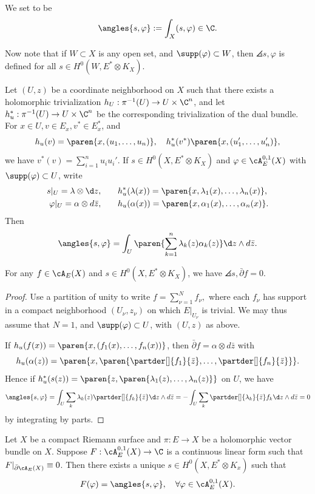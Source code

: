 \documentclass[11pt]{report}
\begin{document}
\begin{defn}
We set  to be
\[
\angles{s,\varphi}:= \int_X(s,\varphi) \in \C.
\]
\end{defn}
Now note that if $W \subset X$ is any open set, and $\supp(\varphi) \subset W$, then $\angles{s,\varphi}$ is defined for all $s \in H^0(W,E^*\otimes K_X)$.

Let $(U,z)$ be a coordinate neighborhood on $X$ such that there exists a holomorphic trivialization $h_U: \pi^{-1}(U) \to U \times \C^n$, and let $h_u^*:\pi^{-1}(U) \to U \times \C^n$ be the corresponding trivialization of the dual bundle. For $x \in U,v \in E_x,v^*\in E_x^*$, and 
\[
h_u(v)=\paren{x,(u_1,\dots,u_n)}, \quad h_u^*(v^*)\paren{x,(u_1',\dots,u_n')},
\]
we have $v^*(v)= \sum _{i=1}^nu_iu_i'$. If $s \in H^0(X,E^* \otimes K_X)$ and $\varphi \in \cA_E^{0,1}(X)$ with $\supp(\varphi) \subset U$, write
\begin{align*}
    s|_U = \lambda \otimes \d z, &\qquad h_u^*(\lambda(x))  = \paren{x,\lambda_1(x),\dots,\lambda_n(x)}, \\
    \varphi|_U = \alpha \otimes d \bar z, &\qquad h_u(\alpha (x)) = \paren{x, \alpha_1(x),\dots,\alpha_n(x)}.
\end{align*}
Then
\[
\angles{s, \varphi}=\int_U \paren{\sum_{k=1}^n \lambda _k(z)\alpha_k(z)}\d z \land d \bar z.
\]

\begin{claim}
For any $f \in \cA_E(X)$ and $s \in H^0(X,E^*\otimes K_X)$, we have $\angles{s, \bar \partial f}=0$.
\end{claim}

\begin{proof}
Use a partition of unity to write $f = \sum_{\nu=1}^Nf_\nu,$ where each $f_\nu$ has support in a compact neighborhood $(U_\nu,z_\nu)$ on which $E|_{U_\nu}$ is trivial. We may thus assume that $N=1$, and $\supp(\varphi) \subset U$, with $(U,z)$ as above.

If $h_u(f(x))=\paren{x,(f_1(x),\dots,f_n(x))}$, then $\bar \partial f = \alpha \otimes d \bar z$ with
\[
h_u(\alpha(z)) = \paren{x,\paren{\partder[]{f_1}{\bar z},\dots,\partder[]{f_n}{\bar z}}}.
\]
Hence if $h_u^*(s(z))=\paren{z,\paren{\lambda_1(z),\dots,\lambda_n(z)}}$ on $U$, we have
\[
\angles{s,\varphi}=\int_U \sum_k \lambda _k(z) \partder[]{f_k}{\bar z}\d z \land d \bar z = -\int_U \sum_k \partder[]{\lambda_k}{\bar z}f_k \d z\land d\bar z=0
\]
by integrating by parts.
\end{proof}

\begin{thm} \label{thm:weyl-lemma-regularity-thm}
Let $X$ be a compact Riemann surface and $\pi :E \to X$ be a holomorphic vector bundle on $X$. Suppose $F:\cA_E^{0,1}(X) \to \C$ is a continuous linear form such that $F|_{\bar \partial \cA_E(X)}\equiv 0$. Then there exists a unique $s\in H^0(X,E^*\otimes K_x)$ such that
\[
F(\varphi) = \angles{s,\varphi}, \quad \forall \varphi \in \cA_E^{0,1}(X).
\]
\end{thm}
\end{document}
